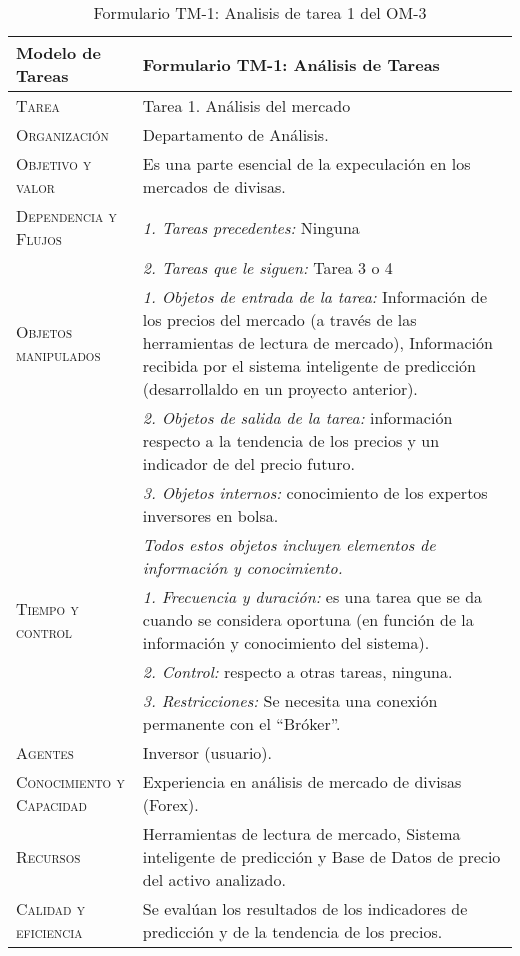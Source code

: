 \begin{table}[H]
	\scriptsize
	\begin{tabularx}{\textwidth}{|l|X|} 
		\hline
	
		\textbf{Modelo de Tareas} & \textbf{Formulario TM-1: Análisis de Tareas} \\ 
		\hline\hline
		\textsc{Tarea} & Tarea 1. Análisis del mercado\\ 
		\hline
		\textsc{Organización}  & Departamento de Análisis.\\ 
		\hline
		\textsc{Objetivo y valor} &  Es una parte esencial de la expeculación en los mercados de divisas.\\ 
		\hline
		\textsc{Dependencia y Flujos} & \textit{1. Tareas precedentes:} Ninguna\\ &  \textit{2. Tareas que le siguen:} Tarea 3 o 4 \\
		\hline
		\textsc{Objetos manipulados} & \textit{1. Objetos de entrada de la tarea:} Información de los precios del mercado (a través de las herramientas de lectura de mercado), Información recibida por el sistema inteligente de predicción (desarrollaldo en un proyecto anterior).\\ & \textit{2. Objetos de salida de la tarea:} información respecto a la tendencia de los precios y un indicador de del precio futuro.\\  & \textit{3. Objetos internos:} conocimiento de los  expertos inversores en bolsa. \\ & \emph{Todos estos objetos incluyen elementos de información y conocimiento.}\\
		\hline
		\textsc{Tiempo y control} & \textit{1. Frecuencia y duración:} es una tarea que se da cuando se considera  oportuna (en función de la información y conocimiento del sistema).\\ & \textit{2. Control:} respecto a otras  tareas, ninguna.\\ & \textit{3. Restricciones:} Se necesita una conexión permanente con el ``Bróker''. \\
		\hline
		\textsc{Agentes} & Inversor (usuario).\\
		\hline
		\textsc{Conocimiento y Capacidad} & Experiencia en análisis de mercado de divisas (Forex). \\
		\hline
		\textsc{Recursos} & Herramientas de lectura de mercado, Sistema inteligente de predicción y  Base de Datos de precio del activo analizado. \\
		\hline
		\textsc{Calidad y eficiencia} & Se evalúan los resultados de los indicadores de predicción y de la tendencia de los precios. \\
		\hline
	\end{tabularx}
	\caption{\label{tab:TM1T1}Formulario TM-1: Analisis de tarea 1 del OM-3}
\end{table} 


